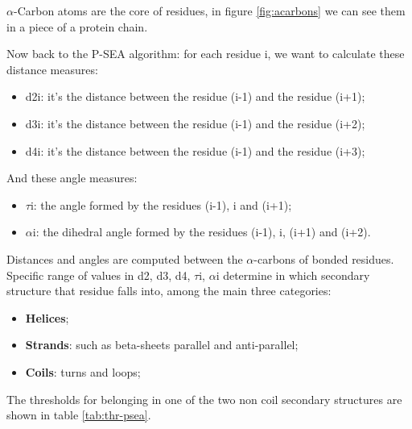 $\alpha$-Carbon atoms are the core of residues, in figure \ref{fig:acarbons} we can see them in a piece of a protein chain.

Now back to the P-SEA algorithm: for each residue i, we want to calculate these distance measures:
\begin{itemize}
    \item d2i: it's the distance between the residue (i-1) and the residue (i+1);
    \item d3i: it's the distance between the residue (i-1) and the residue (i+2);
    \item d4i: it's the distance between the residue (i-1) and the residue (i+3);
\end{itemize}

And these angle measures:
\begin{itemize}
    \item $\tau$i: the angle formed by the residues (i-1), i and (i+1);
    \item $\alpha$i: the dihedral angle formed by the residues (i-1), i, (i+1) and (i+2).
\end{itemize}

Distances and angles are computed between the $\alpha$-carbons of bonded residues.
Specific range of values in d2, d3, d4, $\tau$i, $\alpha$i determine in which secondary structure that residue falls into, among the main three categories:
\begin{itemize}
    \item \textbf{Helices};
    \item \textbf{Strands}: such as beta-sheets parallel and anti-parallel;
    \item \textbf{Coils}: turns and loops;
\end{itemize}

The thresholds for belonging in one of the two non coil secondary structures are shown in table \ref{tab:thr-psea}.

